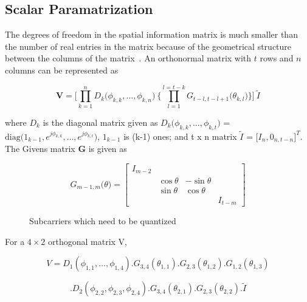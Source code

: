 \documentclass[conference]{IEEEtran}
\begin{document}
\subsection{Scalar Paramatrization}
\label{givens}
The degrees of freedom in the spatial information matrix is much smaller than the number of real entries in the matrix because of the geometrical structure between the columns of the matrix~\cite{4114278}. An orthonormal matrix with $t$ rows and $n$ columns can be represented as


\begin{equation}
\textbf{V} = \Bigg[\prod_{k=1}^{n} D_{k} \big( \phi_{k,k},\ldots , \phi_{k,n} \big) \: \Bigg\{ \prod_{l=1}^{l=t-k} G_{t-l,t-l+1} \big( \theta_{k,l}\big) \Bigg\} \Bigg] \: \tilde{I}
\end{equation}

where $D_{k}$ is the diagonal matrix given as $D_{k}\big(\phi_{k,k}, \ldots, \phi_{k,t} \big)$ =  $\mbox{diag}\big( 1_{k-1}, e^{j\phi_{k,k}},\ldots, e^{j\phi_{k,t}}  \big)$, $1_{k-1}$ is (k-1) ones; and t x n matrix $\tilde{I}$ = $\big[I_{n}, 0_{n,t-n}\big]^{T}$. The Givens matrix \textbf{G} is given as

\begin{equation}
G_{m-1,m}\big(\theta\big)  =
\begin{bmatrix}

I_{m-2} & & & \\
& \cos\theta & -\sin\theta & \\
& \sin\theta & \cos\theta & \\
& & & I_{t-m}

\end{bmatrix}
\end{equation}


\begin{figure}
\label{adpm-fig}
\caption{Subcarriers which need to be quantized}
\label{ber_overvie}
\vspace{-5pt}
\end{figure}


For a $4 \times 2$ orthogonal matrix V,

$$V = D_{1}(\phi_{1,1},\ldots,\phi_{1,4}).G_{3,4}(\theta_{1,1}) .G_{2,3}(\theta_{1,2}) .G_{1,2}(\theta_{1,3})$$

\vspace{-1.4em}

\hspace{1pt}$$.D_{2}(\phi_{2,2},\phi_{2,3},\phi_{2,4}) .G_{3,4}(\theta_{2,1}) .G_{2,3}(\theta_{2,2}).\tilde{I}$$
\end{document}
